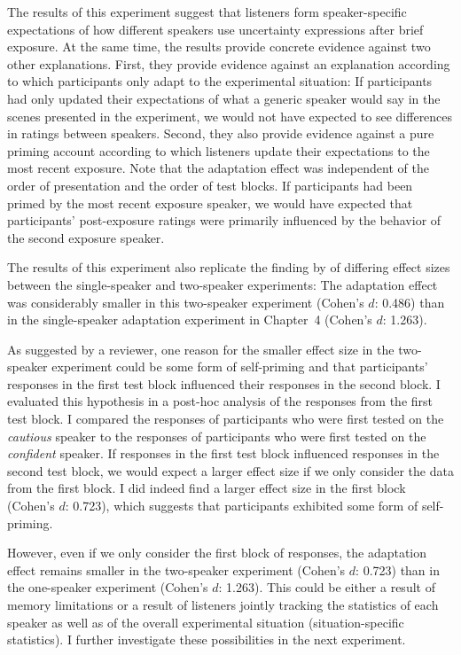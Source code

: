 The results of this experiment suggest that listeners form speaker-specific expectations 
of how different speakers use uncertainty expressions after brief exposure. At the same time, the results provide
concrete evidence against two other explanations. First, they provide evidence against an explanation
according to which participants only adapt to the experimental situation: If participants had only updated 
their expectations of what a generic speaker would say in the scenes presented
in the experiment, we would not have expected to see differences in ratings between speakers. Second, they also 
provide evidence against a pure priming account according to which listeners update their expectations to the most 
recent exposure. Note that the adaptation effect was independent of the order of presentation 
and the order of test blocks. If participants had been primed by the most recent exposure speaker, we would have
expected that participants' post-exposure ratings were primarily influenced by the behavior of the second exposure speaker.


The results of this experiment also replicate the 
finding by \cite{Yildirim2016} of differing effect sizes between the single-speaker and
two-speaker experiments: The adaptation effect
was considerably smaller in this two-speaker experiment (Cohen's $d$: 0.486) than in 
the single-speaker adaptation experiment in Chapter~4 (Cohen's $d$: 1.263). 

As suggested by a reviewer, one reason for the smaller effect size in the two-speaker
experiment could be some form of self-priming and that participants' responses in the first 
test block influenced their responses in the second block. I evaluated this hypothesis
in a post-hoc analysis of the responses from the first test block. I 
compared the responses of participants who were first
tested on the \textit{cautious} speaker to the responses of participants who were first tested 
on the \textit{confident} speaker. If responses in the first test block influenced responses in 
the second test block, we would expect a larger effect size if we only consider the data
from the first block. I did indeed find a larger effect size in the first block (Cohen's $d$: 0.723), which
suggests that participants exhibited some form of self-priming.


However, even if we only consider the first block of responses, the adaptation effect 
remains smaller in the two-speaker experiment (Cohen's $d$: 0.723) than in the
one-speaker experiment (Cohen's $d$: 1.263). This could be either a result of memory limitations 
or a result of listeners jointly tracking the statistics of each speaker
as well as of the overall experimental situation (situation-specific statistics).
I further investigate these possibilities in the next experiment.


